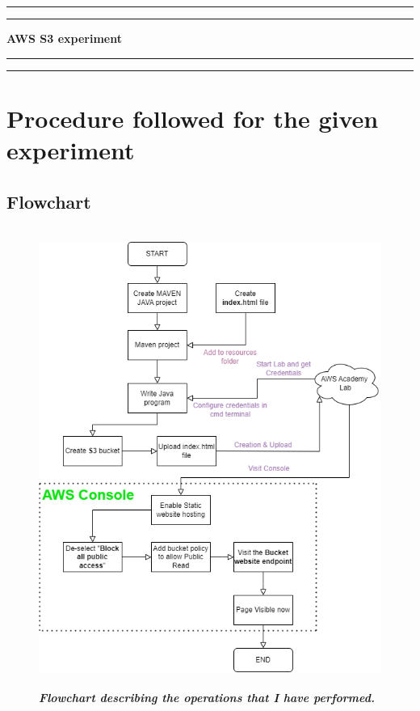
\newpage

\begin{flushright}
  \vspace{10cm}
  \rule{18cm}{5pt}
  \rule{18cm}{2pt}\vskip1cm
  \begin{center}
    \begin{bfseries}
      \Huge{\textbf{AWS S3 experiment}}\\
    \end{bfseries}
  \end{center}
  \vspace{1cm}
  \rule{18cm}{2pt}
  \rule{18cm}{5pt}
\end{flushright}
\newpage

\chapter{Procedure followed for the given experiment}
\section{Flowchart}

\begin{figure}[htp]
    \centering
    \includegraphics[scale=1, width=12cm,height=15cm]{PROBLEM 2/Flowchart.png}
    \caption{\textbf{\textit{Flowchart describing the operations that I	have performed.}}}
    \label{fig:flowchart}
\end{figure}

